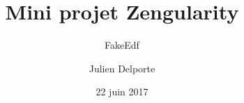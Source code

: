 \documentclass{beamer}
\title{Mini projet Zengularity}
\subtitle{FakeEdf}
\author{Julien Delporte}
\date{22 juin 2017}
\begin{document}
\begin{frame}
\titlepage
\end{frame}


\end{document}
